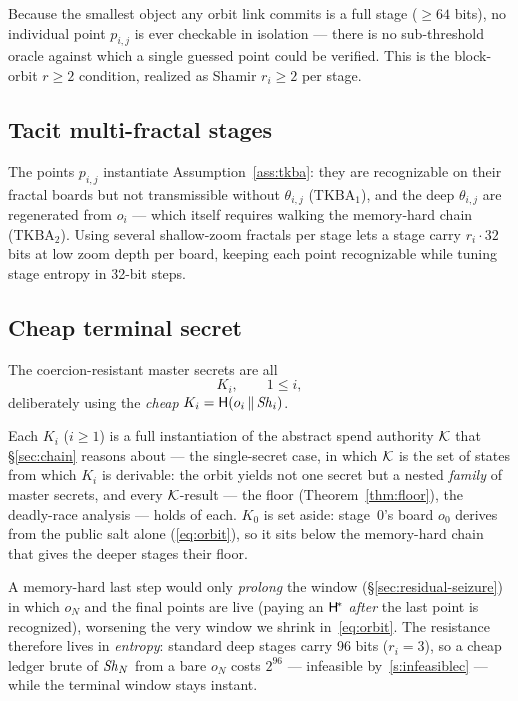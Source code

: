 \begin{remark}
Because the smallest object any orbit link commits is a full stage ($\ge 64$
bits), no individual point $p_{i,j}$ is ever checkable in isolation --- there is
no sub-threshold oracle against which a single guessed point could be verified.
This is the block-orbit $r \ge 2$ condition, realized as Shamir $r_i \ge 2$ per
stage.
\end{remark}

\subsection{Tacit multi-fractal stages}

The points $p_{i,j}$ instantiate Assumption~\ref{ass:tkba}: they are
recognizable on their fractal boards but not transmissible without
$\theta_{i,j}$ (TKBA$_1$), and the deep $\theta_{i,j}$ are regenerated from
$o_i$ --- which itself requires walking the memory-hard chain (TKBA$_2$). Using
several shallow-zoom fractals per stage lets a stage carry $r_i \cdot 32$ bits
at low zoom depth per board, keeping each point recognizable while tuning stage
entropy in 32-bit steps.

\subsection{Cheap terminal secret}

The coercion-resistant master secrets are all
\begin{equation}
  K_i, \qquad 1 \le i,
  \label{eq:master}
\end{equation}
deliberately using the \emph{cheap} $K_i = \mathsf{H}(o_i \,\|\, \mathit{Sh}_i)$.

Each $K_i$ ($i \ge 1$) is a full instantiation of the abstract spend authority
$\mathcal{K}$ that \S\ref{sec:chain} reasons about --- the single-secret case, in which
$\mathcal{K}$ is the set of states from which $K_i$ is derivable: the orbit yields not one
secret but a nested \emph{family} of master secrets, and every $\mathcal{K}$-result --- the floor
(Theorem~\ref{thm:floor}), the deadly-race analysis --- holds of each. $K_0$ is set
aside: stage~$0$'s board $o_0$ derives from the public salt alone
(\eqref{eq:orbit}), so it sits below the memory-hard chain that gives the deeper
stages their floor.

A memory-hard last
step would only \emph{prolong} the window (\S\ref{sec:residual-seizure}) in which $o_N$ and the final points are 
live (paying an $\mathsf{H}^{\!*}$ \emph{after} the last point is recognized), worsening the 
very window we shrink in~\eqref{eq:orbit}. The resistance therefore lives in 
\emph{entropy}: standard deep stages carry 96 bits ($r_i = 3$), so a cheap ledger 
brute of $\mathit{Sh}_N$ from a bare $o_N$ costs $2^{96}$ --- infeasible by~\ref{s:infeasiblec} --- while the
terminal window stays instant.

